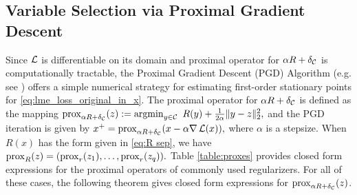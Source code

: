 \subsection{Variable Selection via Proximal Gradient Descent}

Since $\operatorname{\mathcal{L}}$ is differentiable on its domain and 
proximal operator
for $\alpha R + \delta_{\mathcal{C}}$ is 
computationally tractable, 
the Proximal Gradient Descent (PGD) Algorithm (e.g. see \cite{AB17}) offers a simple numerical
strategy for estimating first-order stationary points for 
\eqref{eq:lme_loss_original_in_x}.
%
The proximal operator for 
$\alpha R + \delta_{\mathcal{C}}$ is defined as the mapping
\( %
    \prox_{\alpha R + \delta_{\CC}}(z) := \argmin_{y\in \CC}\ R(y) + \frac{1}{2\alpha}\|y - z\|_2^2 ,
\) %
and the PGD iteration is given by
\(
    x^+ = {\mathrm{prox}}_{\alpha R + \delta_{\mathcal{C}}}(x - \alpha \nabla \operatorname{\mathcal{L}}(x)),
\)
where $\alpha$ is a stepsize.
When $R(x)$ has the form given in \eqref{eq:R sep}, we have
\(
 {\mathrm{prox}}_{R}(z) = ({\mathrm{prox}}_r(z_1), \dots, {\mathrm{prox}}_r(z_q)) .
\)
Table \ref{table:proxes} provides closed form expressions for the proximal operators 
of commonly used regularizers. 
For all of these cases,  the following theorem gives closed form expressions for
${\mathrm{prox}}_{\alpha R + \delta_{\mathcal{C}}}(z)$.


